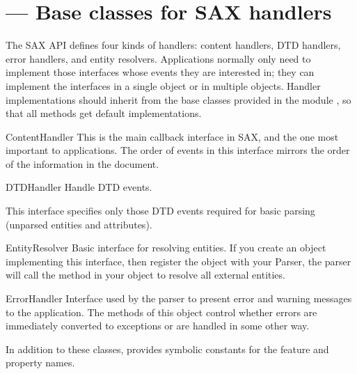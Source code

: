 \section{ ---
         Base classes for SAX handlers}




The SAX API defines four kinds of handlers: content handlers, DTD
handlers, error handlers, and entity resolvers. Applications normally
only need to implement those interfaces whose events they are
interested in; they can implement the interfaces in a single object or
in multiple objects. Handler implementations should inherit from the
base classes provided in the module , so that all
methods get default implementations.

\begin{classdesc}{ContentHandler}{}
  This is the main callback interface in SAX, and the one most
  important to applications. The order of events in this interface
  mirrors the order of the information in the document.
\end{classdesc}

\begin{classdesc}{DTDHandler}{}
  Handle DTD events.

  This interface specifies only those DTD events required for basic
  parsing (unparsed entities and attributes).
\end{classdesc}

\begin{classdesc}{EntityResolver}{}
 Basic interface for resolving entities. If you create an object
 implementing this interface, then register the object with your
 Parser, the parser will call the method in your object to resolve all
 external entities.
\end{classdesc}

\begin{classdesc}{ErrorHandler}{}
  Interface used by the parser to present error and warning messages
  to the application.  The methods of this object control whether errors
  are immediately converted to exceptions or are handled in some other
  way.
\end{classdesc}

In addition to these classes,  provides
symbolic constants for the feature and property names.

